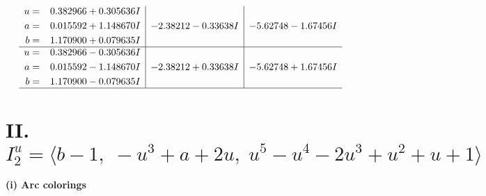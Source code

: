 \documentclass[1p]{elsarticle_modified}
\theoremstyle{definition}
\begin{document}
$$\begin{array}{c|c|c}
\begin{aligned}
u &= \phantom{-}0.382966 + 0.305636 I \\
a &= \phantom{-}0.015592 + 1.148670 I \\
b &= \phantom{-}1.170900 + 0.079635 I\end{aligned}
 & -2.38212 - 0.33638 I & -5.62748 - 1.67456 I \\ \hline\begin{aligned}
u &= \phantom{-}0.382966 - 0.305636 I \\
a &= \phantom{-}0.015592 - 1.148670 I \\
b &= \phantom{-}1.170900 - 0.079635 I\end{aligned}
 & -2.38212 + 0.33638 I & -5.62748 + 1.67456 I\\
 \hline 
 \end{array}$$\newpage\newpage\renewcommand{\arraystretch}{1}
\centering \section*{II. $I^u_{2}= \langle b-1,\;- u^3+a+2 u,\;u^5- u^4-2 u^3+u^2+u+1 \rangle$}
\flushleft \textbf{(i) Arc colorings}\\
\end{document}
